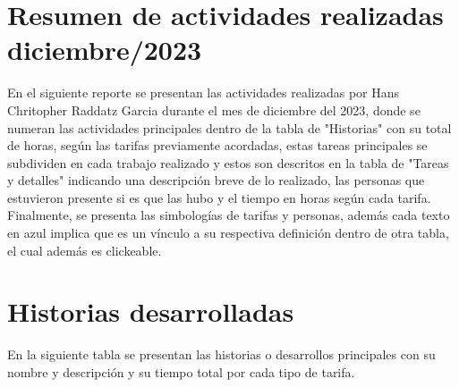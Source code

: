 \documentclass{article}
\begin{document}
\section*{Resumen de actividades realizadas diciembre/2023}

En el siguiente reporte se presentan las actividades realizadas por Hans Chritopher Raddatz Garcia durante el mes de diciembre del 2023, donde se numeran las actividades principales dentro de la tabla de "Historias" con su total de horas, según las tarifas previamente acordadas, estas tareas principales se subdividen en cada trabajo realizado y estos son descritos en la tabla de "Tareas y detalles" indicando una descripción breve de lo realizado, las personas que estuvieron presente si es que las hubo y el tiempo en horas según cada tarifa.
Finalmente, se presenta las simbologías de tarifas y personas, además cada texto en azul implica que es un vínculo a su respectiva definición dentro de otra tabla, el cual además es clickeable. 

\section{Historias desarrolladas}
En la siguiente tabla se presentan las historias o desarrollos principales con su nombre y descripción y su tiempo total por cada tipo de tarifa.
\end{document}
